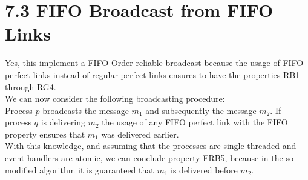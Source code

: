 \documentclass{article}
\begin{document}
	\section*{7.3 FIFO Broadcast from FIFO Links}
	\begin{adjustwidth}{2em}{2em}
		Yes, this implement a FIFO-Order reliable broadcast because the usage of FIFO perfect links instead of regular perfect links ensures to have the properties RB1 through RG4. \\
		We can now consider the following broadcasting procedure: \\
		Process $p$ broadcasts the message $m_1$ and subsequently the message $m_2$. If process $q$ is delivering $m_2$ the usage of any FIFO perfect link with the FIFO property ensures that $m_1$ was delivered earlier. \\
		With this knowledge, and assuming that the processes are single-threaded and event handlers are atomic, we can conclude property FRB5, because in the so modified algorithm it is guaranteed that $m_1$ is delivered before $m_2$.
	\end{adjustwidth}
\end{document}
